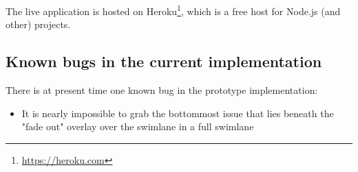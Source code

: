 The live application is hosted on Heroku\footnote{\url{https://heroku.com}}, which is a free host for Node.js (and other) projects.

\subsection{Known bugs in the current implementation}

There is at present time one known bug in the prototype implementation:

\begin{itemize}
  \item It is nearly impossible to grab the bottommost issue that lies beneath the "fade out" overlay over the swimlane in a full swimlane
\end{itemize}
